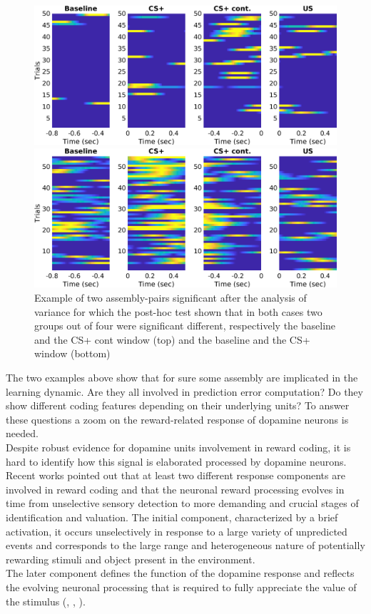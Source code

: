 \begin{figure}
    \centering
    \includegraphics[scale=0.4]{figures/SPN_DANexPreRew.png}
    
   \vspace{1cm}
   
   \includegraphics[scale=0.4]{figures/SPN_DANexStim1.png}
    \caption{Example of two assembly-pairs significant after the analysis of variance for which the post-hoc test shown that in both cases two groups out of four were significant different, respectively the baseline and the CS+ cont window (top) and the baseline and the CS+ window (bottom) }
    \label{fig:SPN_Ex}
\end{figure}
The two examples above show that for sure some assembly are implicated in the learning dynamic. Are they all involved in prediction error computation? Do they show different coding features depending on their underlying units? To answer these questions a zoom on the reward-related response of dopamine neurons is needed.\\Despite robust evidence for dopamine units involvement in reward coding, it is hard to identify how this signal is elaborated processed by dopamine neurons. Recent works pointed out that at least two different response components are involved in reward coding and that the neuronal reward processing evolves in time from unselective sensory detection to more demanding and crucial stages of identification and valuation. The initial component, characterized by a brief activation, it occurs unselectively in response to a large variety of unpredicted events and corresponds to the large range and heterogeneous nature of potentially rewarding stimuli and object present in the environment.\\The later component defines the function of the dopamine response and reflects the evolving neuronal processing that is required to fully appreciate the value of the stimulus (\cite{Tobler2003}, \cite{Nomoto2010}, \cite{Fiorillo2013} \cite{Schultz2016}).\\
